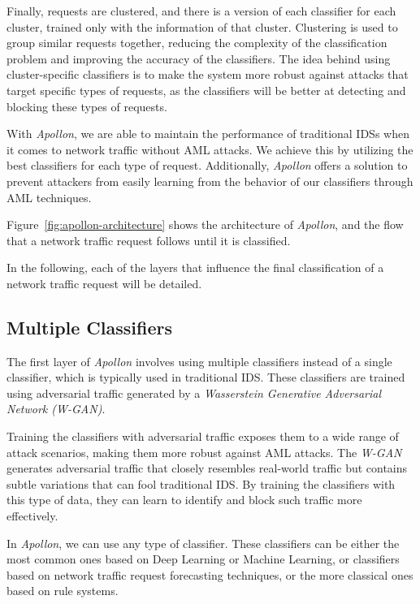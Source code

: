Finally, requests are clustered, and there is a version of each classifier for each cluster, trained only with the
information of that cluster.
Clustering is used to group similar requests together, reducing the complexity of the classification problem and
improving the accuracy of the classifiers.
The idea behind using cluster-specific classifiers is to make the system more robust against attacks that target
specific types of requests, as the classifiers will be better at detecting and blocking these types of requests.

With \textit{Apollon}, we are able to maintain the performance of traditional IDSs when it comes to network traffic without
AML attacks.
We achieve this by utilizing the best classifiers for each type of request.
Additionally, \textit{Apollon} offers a solution to prevent attackers from easily learning from the behavior of our classifiers
through AML techniques.

Figure~\ref{fig:apollon-architecture} shows the architecture of \textit{Apollon}, and the flow that a network traffic request
follows until it is classified.

In the following, each of the layers that influence the final classification of a network traffic request will be
detailed.


\subsection{Multiple Classifiers}\label{subsec:multiple-classifiers}
The first layer of \textit{Apollon} involves using multiple classifiers instead of a single classifier, which is typically used
in traditional IDS.
These classifiers are trained using adversarial traffic generated by a \textit{Wasserstein Generative Adversarial Network
(W-GAN)}.

Training the classifiers with adversarial traffic exposes them to a wide range of attack scenarios, making them more
robust against AML attacks.
The \textit{W-GAN} generates adversarial traffic that closely resembles real-world traffic but contains subtle variations that
can fool traditional IDS.
By training the classifiers with this type of data, they can learn to identify and block such traffic more effectively.

In \textit{Apollon}, we can use any type of classifier.
These classifiers can be either the most common ones based on Deep Learning or Machine Learning, or classifiers based
on network traffic request forecasting techniques, or the more classical ones based on rule systems.

